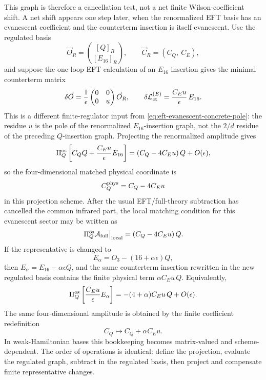This graph is therefore a cancellation test, not a net finite Wilson-coefficient
shift.  A net shift appears one step later, when the renormalized EFT basis has
an evanescent coefficient and the counterterm insertion is itself evanescent.
Use the regulated basis
\[
  \vec O_R=
  \binom{[Q]_R}{[E_{16}]_R},
  \qquad
  \vec C_R=(C_Q,\ C_E),
\]
and suppose the one-loop EFT calculation of an \(E_{16}\) insertion gives the
minimal counterterm matrix
\begin{equation}
  \delta\vec O
  =
  \frac1{\epsilon}
  \begin{pmatrix}
    0&0\\
    0&u
  \end{pmatrix}
  \vec O_R ,
  \qquad
  \delta{\cal L}_{\rm ct}^{(E)}
  =
  \frac{C_Eu}{\epsilon}\,E_{16}.
  \label{eq:eft-evanescent-counterterm-matrix}
\end{equation}
This is a different finite-regulator input from
\eqref{eq:eft-evanescent-concrete-pole}: the residue \(u\) is the pole of the
renormalized \(E_{16}\)-insertion graph, not the \(2/d\) residue of the
preceding \(Q\)-insertion graph.  Projecting the renormalized amplitude gives
\begin{equation}
  \Pi_Q^{\rm os}
  \left[
    C_Q Q+\frac{C_Eu}{\epsilon}E_{16}
  \right]
  =
  \left(C_Q-4C_Eu\right)Q+O(\epsilon),
  \label{eq:eft-evanescent-renormalized-finite-shift}
\end{equation}
so the four-dimensional matched physical coordinate is
\[
  C_Q^{\rm phys}=C_Q-4C_Eu
\]
in this projection scheme.  After the usual EFT/full-theory subtraction has
cancelled the common infrared part, the local matching condition for this
evanescent sector may be written as
\[
  \left.\Pi_Q^{\rm os}{\cal A}_{\rm full}\right|_{\rm local}
  =
  \left(C_Q-4C_Eu\right)Q .
\]
If the representative is changed to
\[
  E_\alpha=O_3-(16+\alpha\epsilon)Q,
\]
then \(E_\alpha=E_{16}-\alpha\epsilon Q\), and the same counterterm insertion
rewritten in the new regulated basis contains the finite physical term
\(\alpha C_Eu\,Q\).  Equivalently,
\[
  \Pi_Q^{\rm os}
  \left[
    \frac{C_Eu}{\epsilon}E_\alpha
  \right]
  =
  -(4+\alpha)C_Eu\,Q+O(\epsilon).
\]
The same four-dimensional amplitude is obtained by the finite coefficient
redefinition
\[
  C_Q\longmapsto C_Q+\alpha C_Eu .
\]
In weak-Hamiltonian bases this bookkeeping becomes matrix-valued and
scheme-dependent.  The order of operations is identical: define the projection,
evaluate the regulated graph, subtract in the regulated basis, then project
and compensate finite representative changes.

